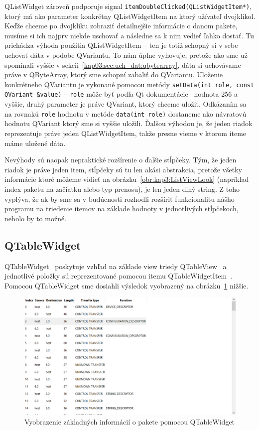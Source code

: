 QListWidget zároveň podporuje signal \texttt{itemDoubleClicked(QListWidgetItem*)}, ktorý má ako parameter konkrétny QListWidgetItem na ktorý užívateľ dvojklikol. Keďže chceme po dvojkliku zobraziť detailnejšie informácie o danom pakete, musíme si ich najprv niekde uschovať a následne sa k nim vedieť ľahko dostať. Tu prichádza výhoda použitia QListWidgetItem -- ten je totiž schopný si v sebe uchovať dáta v podobe QVariantu. To nám úplne vyhovuje, pretože ako sme už spomínali vyššie v sekcii~\ref{kap03:sec:uch_dat:qbytearray}, dáta si uchovávame práve v QByteArray, ktorý sme schopní zabaliť do QVariantu. Uloženie konkrétneho QVariantu je vykonané pomocou metódy \texttt{setData(int role, const QVariant \&value)} -- \texttt{role} môže byť podľa Qt dokumentácie~\cite{qitemdatarole} hodnota 256 a vyššie, druhý parameter je práve QVariant, ktorý chceme uložiť. Odkázaním sa na rovnakú \texttt{role} hodnotu v metóde \texttt{data(int role)} dostaneme ako návratovú hodnotu QVariant ktorý sme si vyššie uložili. Ďalšou výhodou je, že jeden riadok reprezentuje práve jeden QListWidgetItem, takže presne vieme v ktorom iteme máme uložené dáta.

Nevýhody sú naopak nepraktické rozšírenie o ďalšie stĺpčeky. Tým, že jeden riadok je práve jeden item, stĺpčeky sú tu len akási abstrakcia, pretože všetky informácie ktoré môžeme vidieť na obrázku~\ref{obr:kap3:ListViewLook} (napríklad index paketu na začiatku alebo typ prenosu), je len jeden dlhý string. Z toho vyplýva, že ak by sme sa v budúcnosti rozhodli rozšíriť funkcionalitu nášho programu na triedenie itemov na základe hodnoty v jednotlivých stĺpčekoch, nebolo by to možné.

\subsection*{QTableWidget}
\label{kap03:sec:table_widget}
QTableWidget~\cite{qtablewidget} poskytuje vzhľad na základe view triedy QTableView~\cite{qtableview} a jednotlivé položky sú reprezentované pomocou itemu QTableWidgetItem~\cite{qtablewidgetitem}. Pomocou QTableWidget sme dosiahli výsledok vyobrazený na obrázku~\ref{obr:kap3:TableViewLook} nižšie.

\begin{figure}[!htb]
	\centering
	\includegraphics[width=\textwidth]{img/kap03_TableViewLook}
	\caption{Vyobrazenie základných informácií o pakete pomocou QTableWidget}
	\label{obr:kap3:TableViewLook}
\end{figure}

